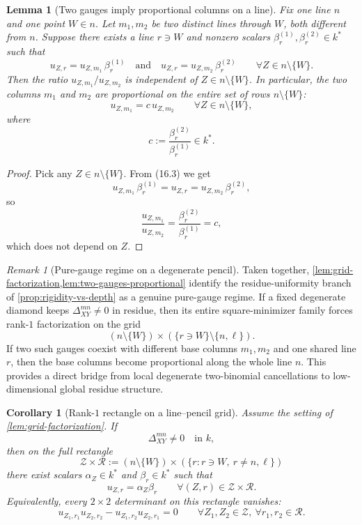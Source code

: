 \documentclass[11pt]{amsart}
\numberwithin{equation}{section}
\theoremstyle{plain}
\newtheorem{lemma}[theorem]{Lemma}
\newtheorem{corollary}[theorem]{Corollary}
\theoremstyle{definition}
\theoremstyle{remark}
\newtheorem{remark}[theorem]{Remark}
\begin{document}
\begin{lemma}[Two gauges imply proportional columns on a line]
\label{lem:two-gauges-proportional}
Fix one line $n$ and one point $W\in n$. Let $m_1,m_2$ be two distinct lines through $W$, both different from $n$. Suppose there exists a line $r\ni W$ and nonzero scalars $\beta^{(1)}_r,\beta^{(2)}_r\in k^*$ such that
\[
u_{Z,r}=u_{Z,m_1}\,\beta^{(1)}_r
\quad\text{and}\quad
u_{Z,r}=u_{Z,m_2}\,\beta^{(2)}_r
\qquad\forall Z\in n\setminus\{W\}.
\tag{16.3}
\]
Then the ratio $u_{Z,m_1}/u_{Z,m_2}$ is independent of $Z\in n\setminus\{W\}$. In particular, the two columns $m_1$ and $m_2$ are proportional on the entire set of rows $n\setminus\{W\}$:
\[
u_{Z,m_1}=c\,u_{Z,m_2}
\qquad\forall Z\in n\setminus\{W\},
\tag{16.4}
\]
where
\[
c:=\frac{\beta^{(2)}_r}{\beta^{(1)}_r}\in k^*.
\]
\end{lemma}

\begin{proof}
Pick any $Z\in n\setminus\{W\}$. From \textup{(16.3)} we get
\[
u_{Z,m_1}\,\beta^{(1)}_r=u_{Z,r}=u_{Z,m_2}\,\beta^{(2)}_r,
\]
so
\[
\frac{u_{Z,m_1}}{u_{Z,m_2}}=\frac{\beta^{(2)}_r}{\beta^{(1)}_r}=c,
\]
which does not depend on $Z$.
\end{proof}

\begin{remark}[Pure-gauge regime on a degenerate pencil]
\label{rem:degenerate-pure-gauge-branch}
Taken together, \cref{lem:grid-factorization,lem:two-gauges-proportional} identify the residue-uniformity branch of \cref{prop:rigidity-vs-depth} as a genuine pure-gauge regime. If a fixed degenerate diamond keeps $\Delta_{XY}^{mn}\neq 0$ in residue, then its entire square-minimizer family forces rank-$1$ factorization on the grid
\[
(n\setminus\{W\})\times(\{r\ni W\}\setminus\{n,\ell\}).
\]
If two such gauges coexist with different base columns $m_1,m_2$ and one shared line $r$, then the base columns become proportional along the whole line $n$. This provides a direct bridge from local degenerate two-binomial cancellations to low-dimensional global residue structure.
\end{remark}

\begin{corollary}[Rank-$1$ rectangle on a line--pencil grid]
\label{cor:rank-one-rectangle}
Assume the setting of \cref{lem:grid-factorization}. If
\[
\Delta_{XY}^{mn}\neq 0
\quad\text{in }k,
\]
then on the full rectangle
\[
\mathcal Z\times \mathcal R
:=(n\setminus\{W\})\times(\{r:r\ni W,\ r\neq n,\ell\})
\]
there exist scalars $\alpha_Z\in k^*$ and $\beta_r\in k^*$ such that
\[u_{Z,r}=\alpha_Z\beta_r
\qquad\forall (Z,r)\in \mathcal Z\times \mathcal R.
\tag{17.2}
\]
Equivalently, every $2\times2$ determinant on this rectangle vanishes:
\[u_{Z_1,r_1}u_{Z_2,r_2}-u_{Z_1,r_2}u_{Z_2,r_1}=0
\qquad\forall Z_1,Z_2\in\mathcal Z,\ \forall r_1,r_2\in\mathcal R.
\tag{17.3}
\]
\end{corollary}
\end{document}
